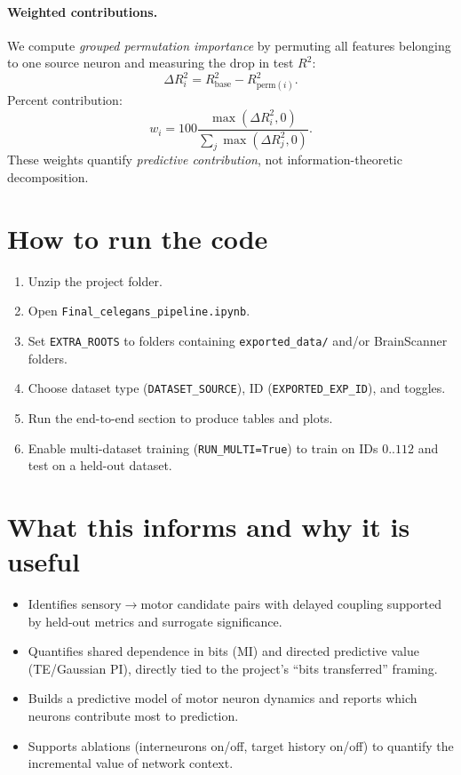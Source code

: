 \documentclass[11pt]{article}
\begin{document}
\paragraph{Weighted contributions.}
We compute \emph{grouped permutation importance} by permuting all features belonging to one source neuron and measuring the drop in test $R^2$:
\[
\Delta R^2_i = R^2_{\text{base}}-R^2_{\text{perm}(i)}.
\]
Percent contribution:
\[
w_i = 100\frac{\max(\Delta R^2_i,0)}{\sum_j \max(\Delta R^2_j,0)}.
\]
These weights quantify \emph{predictive contribution}, not information-theoretic decomposition.

\section{How to run the code}
\begin{enumerate}
  \item Unzip the project folder.
  \item Open \texttt{Final\_celegans\_pipeline.ipynb}.
  \item Set \texttt{EXTRA\_ROOTS} to folders containing \texttt{exported\_data/} and/or BrainScanner folders.
  \item Choose dataset type (\texttt{DATASET\_SOURCE}), ID (\texttt{EXPORTED\_EXP\_ID}), and toggles.
  \item Run the end-to-end section to produce tables and plots.
  \item Enable multi-dataset training (\texttt{RUN\_MULTI=True}) to train on IDs $0..112$ and test on a held-out dataset.
\end{enumerate}

\section{What this informs and why it is useful}
\begin{itemize}
  \item Identifies sensory$\to$motor candidate pairs with delayed coupling supported by held-out metrics and surrogate significance.
  \item Quantifies shared dependence in bits (MI) and directed predictive value (TE/Gaussian PI), directly tied to the project's ``bits transferred'' framing.
  \item Builds a predictive model of motor neuron dynamics and reports which neurons contribute most to prediction.
  \item Supports ablations (interneurons on/off, target history on/off) to quantify the incremental value of network context.
\end{itemize}
\end{document}
